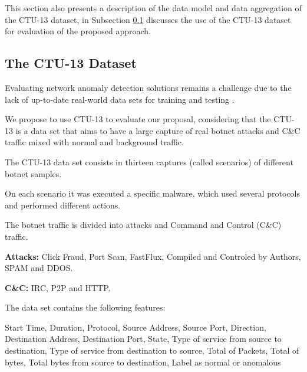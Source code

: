 \documentclass[review]{elsarticle}
\begin{document}
This section also presents a description of the data model and data aggregation of the CTU-13 dataset, in Subsection \ref{sec:CTU-13} discusses the use of the CTU-13 dataset for evaluation of the proposed approach.

\subsection{The CTU-13 Dataset}
\label{sec:CTU-13}


Evaluating network anomaly detection solutions remains a challenge due to the lack of up-to-date real-world data sets for training and testing \cite{osanaiye2016distributed}. 

We propose to use CTU-13 \cite{garcia2014empirical} to evaluate our proposal, considering that the CTU-13 is a data set that aims to have a large capture of real botnet attacks and C\&C traffic mixed with normal and background traffic.

The CTU-13 data set consists in thirteen captures (called scenarios) of different botnet samples. 

On each scenario it was executed a specific malware, which used several protocols and performed different actions.		

The botnet traffic is divided into attacks and Command and Control (C\&C) traffic.

\textbf{Attacks:} Click Fraud, Port Scan, FastFlux, Compiled and Controled by Authors, SPAM and DDOS.

\textbf{C\&C:} IRC, P2P and HTTP.

The data set contains the following features:

Start Time, Duration, Protocol, Source Address, Source Port, Direction, Destination Address, Destination Port, State, Type of service from source to destination, Type of service from destination to source, Total of Packets, Total of bytes, Total bytes from source to destination, Label as normal or anomalous
\end{document}
